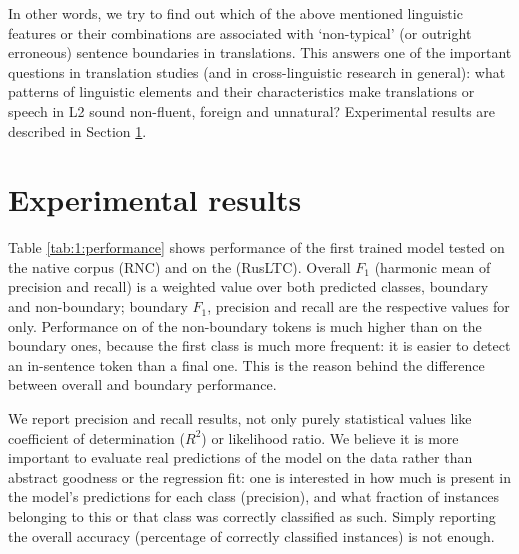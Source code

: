 \documentclass[output=paper]{langsci/langscibook.cls}
\begin{document}
In other words, we try to find out which of the above mentioned linguistic features or their combinations are associated with `non-typical' (or outright erroneous) sentence boundaries in translations. This answers one of the important questions in translation studies (and in cross-linguistic research in general): what patterns of linguistic elements and their characteristics make translations or  speech in L2 sound non-fluent, foreign and unnatural? Experimental results are described in Section \ref{sec:andrey:experiment}.

\section{Experimental results}\label{sec:andrey:experiment} 
Table \ref{tab:1:performance} shows performance of the first trained model tested on the native corpus (RNC) and on the  (RusLTC). Overall $F_{1}$ (harmonic mean of precision and recall) is a weighted value over both predicted classes, boundary and non-boundary; boundary $F_{1}$, precision and recall are the respective values for  only. Performance on  of the non-boundary tokens is much higher than on the boundary ones, because the first class is much more frequent: it is easier to detect an in-sentence token than a final one. This is the reason behind the difference between overall and boundary performance.
 \begin{table}
\caption{Performance of sentence boundary detection model}
\label{tab:1:performance}
\end{table}

We report precision and recall results, not only purely statistical values like coefficient of determination ($R^2$) or likelihood ratio. We believe it is more important to evaluate real predictions of the model on the data rather than abstract goodness or the regression fit: one is interested in how much  is present in the model's predictions for each class (precision), and what fraction of instances belonging to this or that class was correctly classified as such. Simply reporting the overall accuracy (percentage of correctly classified instances) is not enough. 
\end{document}
